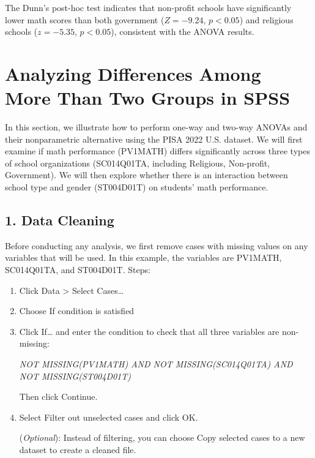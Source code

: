 \documentclass[
  letterpaper,
  DIV=11,
  numbers=noendperiod]{scrreprt}
\begin{document}
The Dunn's post-hoc test indicates that non-profit schools have
significantly lower math scores than both government
(\(Z = -9.24, \,p< 0.05\)) and religious schools
(\(z = -5.35, \,p< 0.05\)), consistent with the ANOVA results.


\chapter*{Analyzing Differences Among More Than Two Groups in
SPSS}\label{analyzing-differences-among-more-than-two-groups-in-spss}


In this section, we illustrate how to perform one-way and two-way ANOVAs
and their nonparametric alternative using the PISA 2022 U.S. dataset. We
will first examine if math performance (PV1MATH) differs significantly
across three types of school organizations (SC014Q01TA, including
Religious, Non-profit, Government). We will then explore whether there
is an interaction between school type and gender (ST004D01T) on
students' math performance.

\section*{1. Data Cleaning}\label{data-cleaning}


Before conducting any analysis, we first remove cases with missing
values on any variables that will be used. In this example, the
variables are PV1MATH, SC014Q01TA, and ST004D01T. Steps:

\begin{enumerate}
\def\labelenumi{\arabic{enumi}.}
\item
  Click Data \textgreater{} Select Cases\ldots{}
\item
  Choose If condition is satisfied
\item
  Click If\ldots{} and enter the condition to check that all three
  variables are non-missing:

  \emph{NOT MISSING(PV1MATH) AND NOT MISSING(SC014Q01TA) AND NOT
  MISSING(ST004D01T)}

  Then click Continue.
\item
  Select Filter out unselected cases and click OK.

  (\emph{Optional}): Instead of filtering, you can choose Copy selected
  cases to a new dataset to create a cleaned file.
\end{enumerate}
\end{document}
